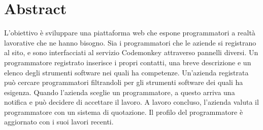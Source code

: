 \section {Abstract}

L'obiettivo è sviluppare una piattaforma web che espone programmatori a realtà lavorative che ne hanno bisogno.
Sia i programmatori che le aziende si registrano al sito, e sono interfacciati al servizio Codemonkey attraverso pannelli diversi.
Un programmatore registrato inserisce i propri contatti, una breve descrizione e un elenco degli strumenti software nei quali ha competenze.
Un'azienda registrata può cercare programmatori filtrandoli per gli strumenti software dei quali ha esigenza. Quando l'azienda sceglie un programmatore, a questo arriva una notifica e può decidere di accettare il lavoro.
A lavoro concluso, l'azienda valuta il programmatore con un sistema di quotazione.
Il profilo del programmatore è aggiornato con i suoi lavori recenti.
